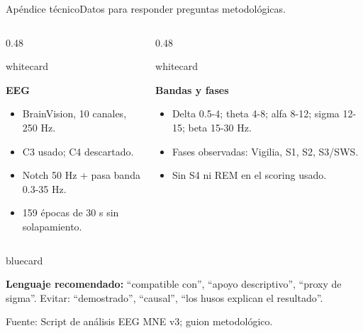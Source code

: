 \documentclass[aspectratio=169,10pt]{beamer}
\newcommand{\source}[1]{\vfill {\tiny\color{Muted}Fuente: #1}}
\newenvironment{card}[2][whitecard]{%
  \begin{beamercolorbox}[wd=#2,sep=0.20cm,rounded=true]{#1}\RaggedRight
}{\end{beamercolorbox}}
\begin{document}
\begin{frame}{Apéndice técnico}{Datos para responder preguntas metodológicas.}
\begin{columns}[T,totalwidth=\textwidth]
\begin{column}{0.48\textwidth}
\begin{card}[whitecard]{\linewidth}
\textbf{EEG}\par
\begin{itemize}
\item BrainVision, 10 canales, 250 Hz.
\item C3 usado; C4 descartado.
\item Notch 50 Hz + pasa banda 0.3-35 Hz.
\item 159 épocas de 30 s sin solapamiento.
\end{itemize}
\end{card}
\end{column}
\begin{column}{0.48\textwidth}
\begin{card}[whitecard]{\linewidth}
\textbf{Bandas y fases}\par
\begin{itemize}
\item Delta 0.5-4; theta 4-8; alfa 8-12; sigma 12-15; beta 15-30 Hz.
\item Fases observadas: Vigilia, S1, S2, S3/SWS.
\item Sin S4 ni REM en el scoring usado.
\end{itemize}
\end{card}
\end{column}
\end{columns}
\vspace{0.35cm}
\begin{card}[bluecard]{\textwidth}
\textbf{Lenguaje recomendado:} ``compatible con'', ``apoyo descriptivo'', ``proxy de sigma''. Evitar: ``demostrado'', ``causal'', ``los husos explican el resultado''.
\end{card}
\source{Script de análisis EEG MNE v3; guion metodológico.}
\end{frame}
\end{document}
